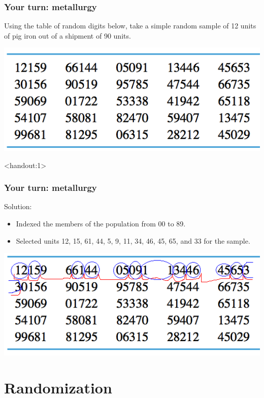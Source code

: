 \documentclass[handout]{beamer}\usepackage{graphicx, color}
\newcommand{\answers}{1}
\numberwithin{equation}{section}
\begin{document}
\begin{frame}
\frametitle{Your turn: metallurgy}

Using the table of random digits below, take a simple random sample of 12 units of pig iron out of a shipment of 90 units.

\begin{center}
 \includegraphics{../../fig/rdigitsshort.png}
\end{center}

\end{frame}


\begin{frame}<handout:\answers>
\frametitle{Your turn: metallurgy}

Solution:
\begin{itemize}
\item Indexed the members of the population from 00 to 89.
\pause \item Selected units 12, 15, 61, 44, 5, 9, 11, 34, 46, 45, 65, and 33 for the sample.
\end{itemize}

\begin{center}
 \includegraphics{../../fig/rdigitsshortmarked.png}
\end{center}

\end{frame}



\section{Randomization}
\end{document}
